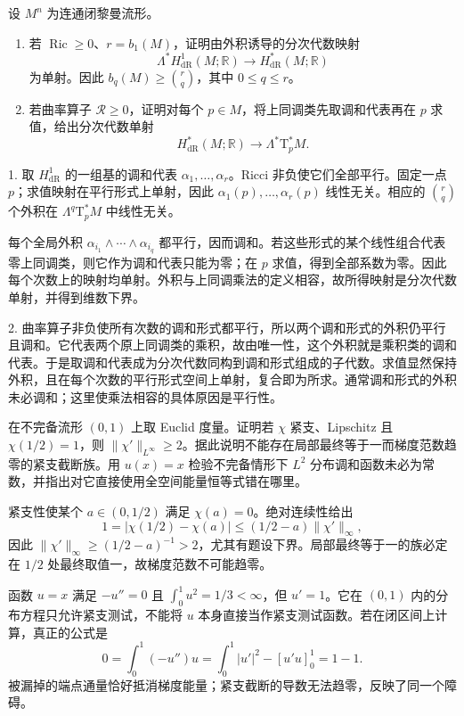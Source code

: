 \begin{exercise}\label{g3:ex:bochner-cohomology-subalgebra}
	设 \(M^n\) 为连通闭黎曼流形。
	\begin{enumerate}
		\item 若 \(\operatorname{Ric}\ge0\)、\(r=b_1(M)\)，证明由外积诱导的分次代数映射
		\[
			\Lambda^*H_{\mathrm{dR}}^1(M;\mathbb R)
			\longrightarrow H_{\mathrm{dR}}^*(M;\mathbb R)
		\]
		为单射。因此 \(b_q(M)\ge\binom rq\)，其中 \(0\le q\le r\)。
		\item 若曲率算子 \(\mathcal R\ge0\)，证明对每个 \(p\in M\)，将上同调类先取调和代表再在 \(p\) 求值，给出分次代数单射
		\[
			H_{\mathrm{dR}}^*(M;\mathbb R)
			\longrightarrow\Lambda^*\mathrm T_p^*M.
		\]
	\end{enumerate}
\end{exercise}
\begin{solution}
	1. 取 \(H_{\mathrm{dR}}^1\) 的一组基的调和代表
	\(\alpha_1,\ldots,\alpha_r\)。Ricci 非负使它们全部平行。固定一点 \(p\)；求值映射在平行形式上单射，因此
	\(\alpha_1(p),\ldots,\alpha_r(p)\) 线性无关。相应的
	\(\binom rq\) 个外积在 \(\Lambda^q\mathrm T_p^*M\) 中线性无关。

	每个全局外积
	\(\alpha_{i_1}\wedge\cdots\wedge\alpha_{i_q}\) 都平行，因而调和。若这些形式的某个线性组合代表零上同调类，则它作为调和代表只能为零；在 \(p\) 求值，得到全部系数为零。因此每个次数上的映射均单射。外积与上同调乘法的定义相容，故所得映射是分次代数单射，并得到维数下界。

	2. 曲率算子非负使所有次数的调和形式都平行，所以两个调和形式的外积仍平行且调和。它代表两个原上同调类的乘积，故由唯一性，这个外积就是乘积类的调和代表。于是取调和代表成为分次代数同构到调和形式组成的子代数。求值显然保持外积，且在每个次数的平行形式空间上单射，复合即为所求。通常调和形式的外积未必调和；这里使乘法相容的具体原因是平行性。
\end{solution}

\begin{exercise}\label{g3:ex:incomplete-cutoff-obstruction}
	在不完备流形 \((0,1)\) 上取 Euclid 度量。证明若 \(\chi\) 紧支、Lipschitz 且 \(\chi(1/2)=1\)，则 \(\|\chi'\|_{L^\infty}\ge2\)。据此说明不能存在局部最终等于一而梯度范数趋零的紧支截断族。用 \(u(x)=x\) 检验不完备情形下 \(L^2\) 分布调和函数未必为常数，并指出对它直接使用全空间能量恒等式错在哪里。
\end{exercise}
\begin{solution}
	紧支性使某个 \(a\in(0,1/2)\) 满足 \(\chi(a)=0\)。绝对连续性给出
	\[
		1=|\chi(1/2)-\chi(a)|
		\le(1/2-a)\|\chi'\|_\infty,
	\]
	因此 \(\|\chi'\|_\infty\ge(1/2-a)^{-1}>2\)，尤其有题设下界。局部最终等于一的族必定在 \(1/2\) 处最终取值一，故梯度范数不可能趋零。

	函数 \(u=x\) 满足 \(-u''=0\) 且 \(\int_0^1u^2=1/3<\infty\)，但 \(u'=1\)。它在 \((0,1)\) 内的分布方程只允许紧支测试，不能将 \(u\) 本身直接当作紧支测试函数。若在闭区间上计算，真正的公式是
	\[
		0=\int_0^1(-u'')u
		=\int_0^1|u'|^2-[u'u]_0^1=1-1.
	\]
	被漏掉的端点通量恰好抵消梯度能量；紧支截断的导数无法趋零，反映了同一个障碍。
\end{solution}

